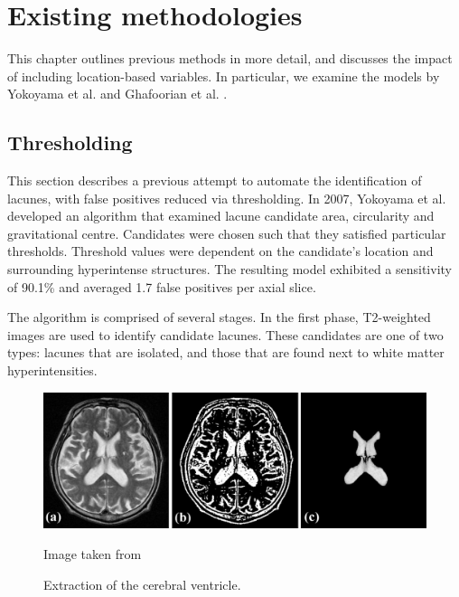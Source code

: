 %
%

\chapter{Existing methodologies}\label{litrev}

This chapter outlines previous methods in more detail, and discusses the impact of including location-based variables. In particular, we examine the models by Yokoyama et al. \cite{Yokoyama2007} and Ghafoorian et al. \cite{GhafoorianM.2017Dml3}.

\section{Thresholding}\label{litrev-threshold}

This section describes a previous attempt to automate the identification of lacunes, with false positives reduced via thresholding. In 2007, Yokoyama et al. \cite{Yokoyama2007} developed an algorithm that examined lacune candidate area, circularity and gravitational centre. Candidates were chosen such that they satisfied particular thresholds. Threshold values were dependent on the candidate's location and surrounding hyperintense structures. The resulting model exhibited a sensitivity of 90.1\% and averaged 1.7 false positives per axial slice.


The algorithm is comprised of several stages. In the first phase, T2-weighted images are used to identify candidate lacunes. These candidates are one of two types: lacunes that are isolated, and those that are found next to white matter hyperintensities.

\begin{figure}[ht]
	\centering
	\includegraphics[width=\textwidth]{Images/5_extract_ventricle.png}
	\caption{Extraction of the cerebral ventricle.}
	\small Image taken from \cite{Yokoyama2007}
\end{figure}

